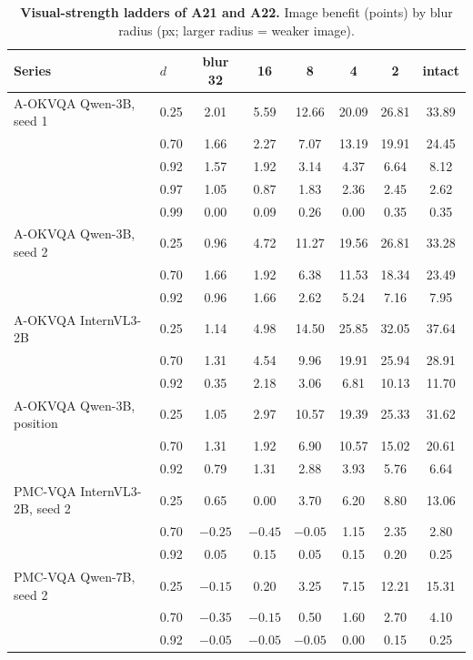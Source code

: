 \begin{table}[t]
  \centering
  \footnotesize
  \setlength{\tabcolsep}{4pt}
  \begin{tabular}{@{}llcccccc@{}}
    \toprule
    Series & $d$ & blur 32 & 16 & 8 & 4 & 2 & intact \\
    \midrule
    A-OKVQA Qwen-3B, seed 1 & 0.25 & 2.01 & 5.59 & 12.66 & 20.09 & 26.81 & 33.89 \\
     & 0.70 & 1.66 & 2.27 & 7.07 & 13.19 & 19.91 & 24.45 \\
     & 0.92 & 1.57 & 1.92 & 3.14 & 4.37 & 6.64 & 8.12 \\
     & 0.97 & 1.05 & 0.87 & 1.83 & 2.36 & 2.45 & 2.62 \\
     & 0.99 & 0.00 & 0.09 & 0.26 & 0.00 & 0.35 & 0.35 \\
    A-OKVQA Qwen-3B, seed 2 & 0.25 & 0.96 & 4.72 & 11.27 & 19.56 & 26.81 & 33.28 \\
     & 0.70 & 1.66 & 1.92 & 6.38 & 11.53 & 18.34 & 23.49 \\
     & 0.92 & 0.96 & 1.66 & 2.62 & 5.24 & 7.16 & 7.95 \\
    A-OKVQA InternVL3-2B & 0.25 & 1.14 & 4.98 & 14.50 & 25.85 & 32.05 & 37.64 \\
     & 0.70 & 1.31 & 4.54 & 9.96 & 19.91 & 25.94 & 28.91 \\
     & 0.92 & 0.35 & 2.18 & 3.06 & 6.81 & 10.13 & 11.70 \\
    A-OKVQA Qwen-3B, position & 0.25 & 1.05 & 2.97 & 10.57 & 19.39 & 25.33 & 31.62 \\
     & 0.70 & 1.31 & 1.92 & 6.90 & 10.57 & 15.02 & 20.61 \\
     & 0.92 & 0.79 & 1.31 & 2.88 & 3.93 & 5.76 & 6.64 \\
    PMC-VQA InternVL3-2B, seed 2 & 0.25 & 0.65 & 0.00 & 3.70 & 6.20 & 8.80 & 13.06 \\
     & 0.70 & $-0.25$ & $-0.45$ & $-0.05$ & 1.15 & 2.35 & 2.80 \\
     & 0.92 & 0.05 & 0.15 & 0.05 & 0.15 & 0.20 & 0.25 \\
    PMC-VQA Qwen-7B, seed 2 & 0.25 & $-0.15$ & 0.20 & 3.25 & 7.15 & 12.21 & 15.31 \\
     & 0.70 & $-0.35$ & $-0.15$ & 0.50 & 1.60 & 2.70 & 4.10 \\
     & 0.92 & $-0.05$ & $-0.05$ & $-0.05$ & 0.00 & 0.15 & 0.25 \\
    \bottomrule
  \end{tabular}
  \caption{\textbf{Visual-strength ladders of A21 and A22.} Image benefit (points) by blur radius (px; larger radius = weaker image).}
  \label{tab:a2xladder}
\end{table}
